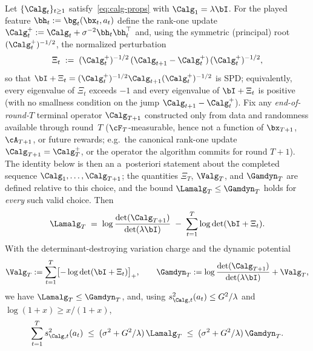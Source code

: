 \begin{lemma}\label{lem:dynamic-potential}
Let $\{\Calg_t\}_{t\ge1}$ satisfy~\eqref{eq:calg-props} with
$\Calg_1=\lambda\bI$.  For the played feature
$\bh_t:=\bg_t(\bx_t,a_t)$ define the rank-one update
$\Calg_t^{+}:=\Calg_t+\sigma^{-2}\bh_t\bh_t^\top$ and, using the symmetric
(principal) root $(\Calg_t^{+})^{-1/2}$, the normalized perturbation
\begin{equation}\label{eq:xi-def}
  \Xi_t \;:=\; (\Calg_t^{+})^{-1/2}\,(\Calg_{t+1}-\Calg_t^{+})\,
  (\Calg_t^{+})^{-1/2},
\end{equation}
so that $\bI+\Xi_t=(\Calg_t^{+})^{-1/2}\Calg_{t+1}(\Calg_t^{+})^{-1/2}$ is SPD;
equivalently, every eigenvalue of $\Xi_t$ exceeds $-1$ and every eigenvalue of
$\bI+\Xi_t$ is positive (with no smallness condition on the jump
$\Calg_{t+1}-\Calg_t^{+}$).  Fix any \emph{end-of-round-$T$} terminal operator
$\Calg_{T+1}$ constructed only from data and randomness available through
round~$T$ ($\cF_T$-measurable, hence not a function of $\bx_{T+1}$, $\cA_{T+1}$,
or future rewards; e.g.\ the canonical rank-one update $\Calg_{T+1}=\Calg_T^{+}$,
or the operator the algorithm commits for round $T{+}1$).  The identity below is
then an a~posteriori statement about the completed sequence
$\Calg_1,\dots,\Calg_{T+1}$; the quantities $\Xi_T$, $\Valg_T$, and $\Gamdyn_T$
are defined relative to this choice, and the bound $\Lamalg_T\le\Gamdyn_T$ holds
for \emph{every} such valid choice.  Then
\begin{equation}\label{eq:lam-identity}
  \Lamalg_T
  \;=\;
  \log\frac{\det(\Calg_{T+1})}{\det(\lambda\bI)}
  \;-\;
  \sum_{t=1}^T \log\det(\bI+\Xi_t).
\end{equation}
With the determinant-destroying variation charge and the dynamic potential
\begin{equation}\label{eq:vdyn-def}
  \Valg_T := \sum_{t=1}^T \bigl[-\log\det(\bI+\Xi_t)\bigr]_+,
  \qquad
  \Gamdyn_T := \log\frac{\det(\Calg_{T+1})}{\det(\lambda\bI)} + \Valg_T,
\end{equation}
we have $\Lamalg_T\le\Gamdyn_T$, and, using
$s_{\Calg,t}^2(a_t)\le G^2/\lambda$ and $\log(1+x)\ge x/(1+x)$,
\begin{equation}\label{eq:width-sum-dyn}
  \sum_{t=1}^T s_{\Calg,t}^2(a_t)
  \;\le\;
  (\sigma^2+G^2/\lambda)\,\Lamalg_T
  \;\le\;
  (\sigma^2+G^2/\lambda)\,\Gamdyn_T .
\end{equation}
\end{lemma}
